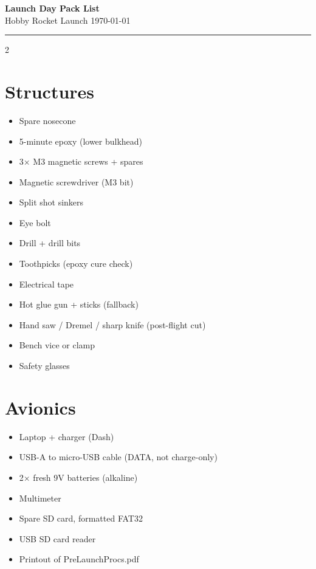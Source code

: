 \documentclass[10pt,a4paper]{article}
\begin{document}
\begin{center}
  {\sffamily\bfseries\color{rocketblue}\Huge Launch Day Pack List}\\[2pt]
  {\sffamily\color{linegrey}\large Hobby Rocket Launch \quad\textbar\quad \today}\\[2pt]
  {\color{rocketred}\rule{0.4\textwidth}{1pt}}
\end{center}

\vspace{4pt}

\begin{multicols}{2}

\section*{Structures}
\begin{itemize}
  \item Spare nosecone
  \item 5-minute epoxy (lower bulkhead)
  \item 3$\times$ M3 magnetic screws + spares
  \item Magnetic screwdriver (M3 bit)
  \item Split shot sinkers
  \item Eye bolt
  \item Drill + drill bits
  \item Toothpicks (epoxy cure check)
  \item Electrical tape
  \item Hot glue gun + sticks (fallback)
  \item Hand saw / Dremel / sharp knife (post-flight cut)
  \item Bench vice or clamp
  \item Safety glasses
\end{itemize}

\section*{Avionics}
\begin{itemize}
  \item Laptop + charger (Dash)
  \item USB-A to micro-USB cable (DATA, not charge-only)
  \item 2$\times$ fresh 9V batteries (alkaline)
  \item Multimeter
  \item Spare SD card, formatted FAT32
  \item USB SD card reader
  \item Printout of PreLaunchProcs.pdf
\end{itemize}


\end{multicols}
\end{document}
